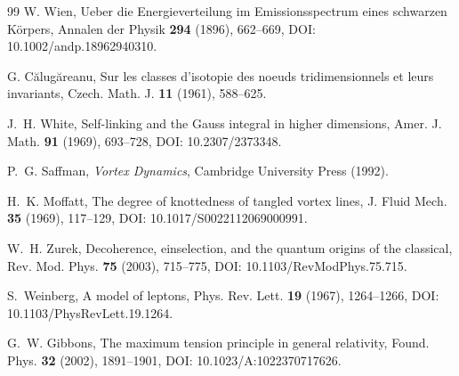 \documentclass[11pt]{article}
\theoremstyle{definition}
\theoremstyle{plain}
\theoremstyle{remark}
\begin{document}
\begin{thebibliography}{99}
            W. Wien,
            \newblock Ueber die Energieverteilung im Emissionsspectrum eines schwarzen K\"orpers,
            \newblock Annalen der Physik \textbf{294} (1896), 662--669,
            \newblock DOI: 10.1002/andp.18962940310.

            G. C\u{a}lug\u{a}reanu,
            \newblock Sur les classes d'isotopie des noeuds tridimensionnels et leurs invariants,
            \newblock Czech. Math. J. \textbf{11} (1961), 588--625.

            J.~H. White,
            \newblock Self-linking and the Gauss integral in higher dimensions,
            \newblock Amer. J. Math. \textbf{91} (1969), 693--728,
            \newblock DOI: 10.2307/2373348.

            P.~G. Saffman,
            \newblock \emph{Vortex Dynamics},
            \newblock Cambridge University Press (1992).

            H.~K. Moffatt,
            \newblock The degree of knottedness of tangled vortex lines,
            \newblock J. Fluid Mech. \textbf{35} (1969), 117--129,
            \newblock DOI: 10.1017/S0022112069000991.

            W.~H. Zurek,
            \newblock Decoherence, einselection, and the quantum origins of the classical,
            \newblock Rev. Mod. Phys. \textbf{75} (2003), 715--775,
            \newblock DOI: 10.1103/RevModPhys.75.715.

            S.~Weinberg,
            \newblock A model of leptons,
            \newblock Phys. Rev. Lett. \textbf{19} (1967), 1264--1266,
            \newblock DOI: 10.1103/PhysRevLett.19.1264.

            G.~W. Gibbons,
            \newblock The maximum tension principle in general relativity,
            \newblock Found. Phys. \textbf{32} (2002), 1891--1901,
            \newblock DOI: 10.1023/A:1022370717626.

        \end{thebibliography}
\end{document}
